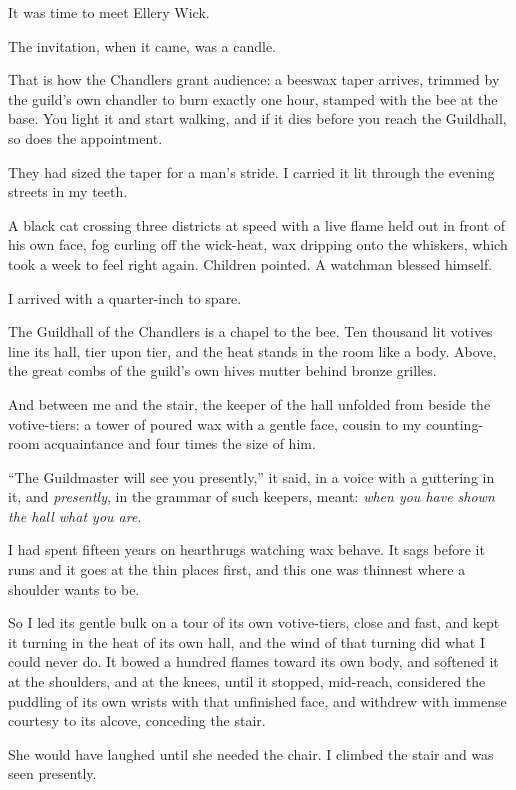 It was time to meet Ellery Wick.

\scenebreak

The invitation, when it came, was a candle.

That is how the Chandlers grant audience: a beeswax taper arrives, trimmed by the guild's own chandler to burn exactly one hour, stamped with the bee at the base. You light it and start walking, and if it dies before you reach the Guildhall, so does the appointment.

They had sized the taper for a man's stride. I carried it lit through the evening streets in my teeth.

A black cat crossing three districts at speed with a live flame held out in front of his own face, fog curling off the wick-heat, wax dripping onto the whiskers, which took a week to feel right again. Children pointed. A watchman blessed himself.

I arrived with a quarter-inch to spare.

The Guildhall of the Chandlers is a chapel to the bee. Ten thousand lit votives line its hall, tier upon tier, and the heat stands in the room like a body. Above, the great combs of the guild's own hives mutter behind bronze grilles.

And between me and the stair, the keeper of the hall unfolded from beside the votive-tiers: a tower of poured wax with a gentle face, cousin to my counting-room acquaintance and four times the size of him.

``The Guildmaster will see you presently,'' it said, in a voice with a guttering in it, and \emph{presently}, in the grammar of such keepers, meant: \emph{when you have shown the hall what you are}.

I had spent fifteen years on hearthrugs watching wax behave. It sags before it runs and it goes at the thin places first, and this one was thinnest where a shoulder wants to be.

So I led its gentle bulk on a tour of its own votive-tiers, close and fast, and kept it turning in the heat of its own hall, and the wind of that turning did what I could never do. It bowed a hundred flames toward its own body, and softened it at the shoulders, and at the knees, until it stopped, mid-reach, considered the puddling of its own wrists with that unfinished face, and withdrew with immense courtesy to its alcove, conceding the stair.

She would have laughed until she needed the chair. I climbed the stair and was seen presently.


